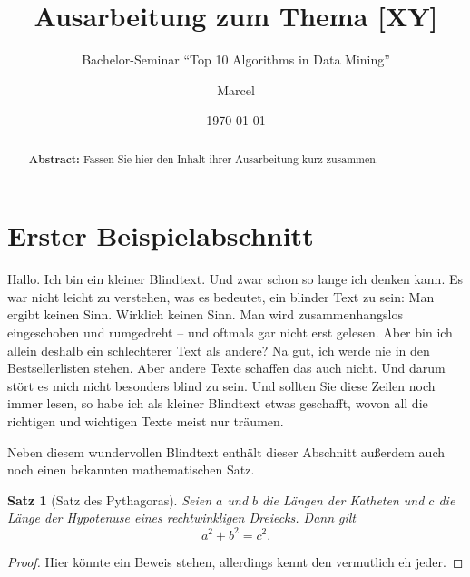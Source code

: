 \documentclass[11pt,a4paper,oneside]{scrartcl}
\newtheorem{satz}{Satz}[section]
\begin{document}
\title{Ausarbeitung zum Thema [XY]}
\subtitle{Bachelor-Seminar "`Top 10 Algorithms in Data Mining"'}



\author{Marcel} 
\date{\today} 

\maketitle

\tableofcontents


\begin{abstract}
\noindent\textbf{Abstract:} 
Fassen Sie hier den Inhalt ihrer Ausarbeitung kurz zusammen.
\end{abstract}

\section{Erster Beispielabschnitt}
Hallo. Ich bin ein kleiner Blindtext. Und zwar schon so lange ich denken kann. Es war nicht leicht zu verstehen, was es bedeutet, ein blinder Text zu sein: Man ergibt keinen Sinn. Wirklich keinen Sinn. Man wird zusammenhangslos eingeschoben und rumgedreht – und oftmals gar nicht erst gelesen. Aber bin ich allein deshalb ein schlechterer Text als andere? Na gut, ich werde nie in den Bestsellerlisten stehen. Aber andere Texte schaffen das auch nicht. Und darum stört es mich nicht besonders blind zu sein. Und sollten Sie diese Zeilen noch immer lesen, so habe ich als kleiner Blindtext etwas geschafft, wovon all die richtigen und wichtigen Texte meist nur träumen.

Neben diesem wundervollen Blindtext enthält dieser Abschnitt außerdem auch noch einen bekannten mathematischen Satz.

\begin{satz}[Satz des Pythagoras]\label{satz:beispiel}
Seien $a$ und $b$ die Längen der Katheten und $c$ die Länge der Hypotenuse eines rechtwinkligen Dreiecks. Dann gilt
\[
a^2 + b^2 = c^2.
\]
\end{satz}
\begin{proof}
Hier könnte ein Beweis stehen, allerdings kennt den vermutlich eh jeder.
\end{proof}
\end{document}
